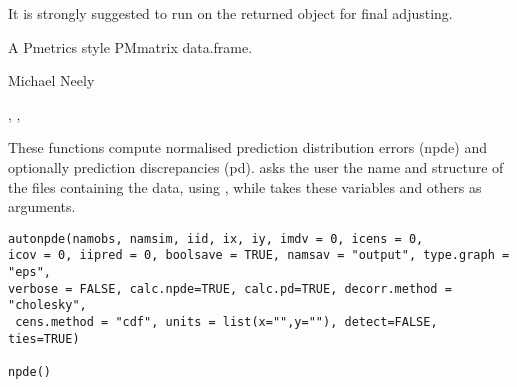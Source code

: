 \documentclass[a4paper]{book}
\begin{document}
\begin{Details}
\begin{itemize}
\end{itemize}

It is strongly suggested to run  on the returned object for final adjusting.
\end{Details}
%
\begin{Value}
A Pmetrics style PMmatrix data.frame.
\end{Value}
%
\begin{Author}\relax
Michael Neely
\end{Author}
%
\begin{SeeAlso}\relax
{}, , 
\end{SeeAlso}
%
\begin{Description}\relax
These functions compute normalised prediction distribution errors (npde) and
optionally prediction discrepancies (pd).  asks the user the name
and structure of the files containing the data, using , while
 takes these variables and others as arguments.
\end{Description}
%
\begin{Usage}
\begin{verbatim}
autonpde(namobs, namsim, iid, ix, iy, imdv = 0, icens = 0,
icov = 0, iipred = 0, boolsave = TRUE, namsav = "output", type.graph = "eps",
verbose = FALSE, calc.npde=TRUE, calc.pd=TRUE, decorr.method = "cholesky",
 cens.method = "cdf", units = list(x="",y=""), detect=FALSE, ties=TRUE)

npde()
\end{verbatim}
\end{Usage}
%
\end{document}
